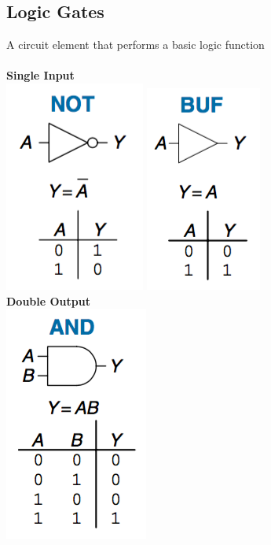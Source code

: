 \documentclass[12pt]{article}
\theoremstyle{definition}
\begin{document}
  \subsection{Logic Gates}
  A circuit element that performs a basic logic function \\ \\
  \textbf{Single Input} \\
  \includegraphics[scale=0.9]{pictures/notGate.png}
  \includegraphics[scale=0.9]{pictures/bufGate.png} \\
  \textbf{Double Output} \\
  \includegraphics[scale=0.9]{pictures/andGate.png}
\end{document}
